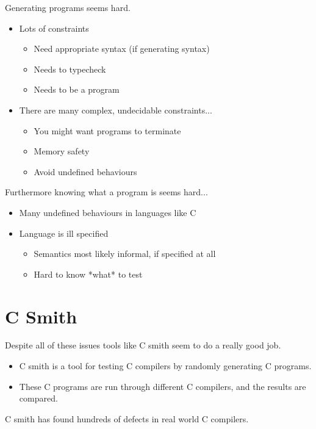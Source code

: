 \documentclass{beamer}
\begin{document}
\begin{frame}

  Generating programs seems hard.

  \begin{itemize}
  \item Lots of constraints
    \begin{itemize}
    \item Need appropriate syntax (if generating syntax)
    \item Needs to typecheck
    \item Needs to be a program
    \end{itemize}
  \item There are many complex, undecidable constraints...
    \begin{itemize}
    \item You might want programs to terminate
    \item Memory safety
    \item Avoid undefined behaviours
    \end{itemize}
  \end{itemize}
\end{frame}

\begin{frame}
  Furthermore knowing what a program is seems hard...

  \begin{itemize}
  \item Many undefined behaviours in languages like C
  \item Language is ill specified
    \begin{itemize}
    \item Semantics most likely informal, if specified at all
    \item Hard to know *what* to test
    \end{itemize}
  \end{itemize}
\end{frame}

\section{C Smith}

\begin{frame}

  Despite all of these issues tools like C smith seem to do a really
  good job.

  \begin{itemize}
  \item C smith is a tool for testing C compilers by randomly
    generating C programs.
  \item These C programs are run through different C compilers, and
    the results are compared.
  \end{itemize}

  C smith has found hundreds of defects in real world C compilers.
\end{frame}
\end{document}
